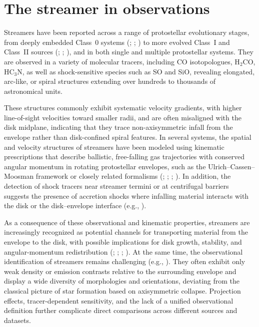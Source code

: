 \section{The streamer in observations}
Streamers have been reported across a range of protostellar evolutionary stages, from deeply embedded Class~0 systems (\citealt{Pineda_2020}; \citealt{Valdivia-Mena_2022}; \citealt{Kido_2023}) to more evolved Class~I and Class~II sources (\citealt{Segura_2016}; \citealt{Gahm_2018}; \citealt{Yen_2019}), and in both single and multiple protostellar systems. They are observed in a variety of molecular tracers, including CO isotopologues, H$_2$CO, HC$_3$N, as well as shock-sensitive species such as SO and SiO, revealing elongated, arc-like, or spiral structures extending over hundreds to thousands of astronomical units. 

These structures commonly exhibit systematic velocity gradients, with higher line-of-sight velocities toward smaller radii, and are often misaligned with the disk midplane, indicating that they trace non-axisymmetric infall from the envelope rather than disk-confined spiral features. In several systems, the spatial and velocity structures of streamers have been modeled using kinematic prescriptions that describe ballistic, free-falling gas trajectories with conserved angular momentum in rotating protostellar envelopes, such as the Ulrich--Cassen--Moosman framework or closely related formalisms (\citealt{Aso_2023}; \citealt{Kido_2023}; \citealt{Flores_2023}; \citealt{Kido_2025}). In addition, the detection of shock tracers near streamer termini or at centrifugal barriers suggests the presence of accretion shocks where infalling material interacts with the disk or the disk--envelope interface (e.g., \citealt{Yen_2017, Yen_2019, Pineda_2020, Speedie_2025}).

As a consequence of these observational and kinematic properties, streamers are increasingly recognized as potential channels for transporting material from the envelope to the disk, with possible implications for disk growth, stability, and angular-momentum redistribution (\citealt{Yen_2019}; \citealt{Pineda_2020}; \citealt{Valdivia-Mena_2022}; \citealt{Hsieh_2023}). At the same time, the observational identification of streamers remains challenging (e.g., \citealt{Gahm_2018, Yen_2019, Valdivia-Mena_2022}). They often exhibit only weak density or emission contrasts relative to the surrounding envelope and display a wide diversity of morphologies and orientations, deviating from the classical picture of star formation based on axisymmetric collapse. Projection effects, tracer-dependent sensitivity, and the lack of a unified observational definition further complicate direct comparisons across different sources and datasets.

